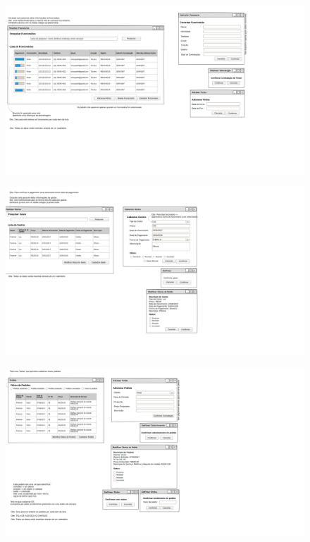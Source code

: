 \documentclass[a4paper,12pt]{article}
\begin{document}
		\begin{figure}[H]
			\centering \includegraphics[width=\textwidth]{./Gerenciar Funcionario.png} 
		\end{figure}
		\begin{figure}[H]
			\centering \includegraphics[width=\textwidth]{./Gerenciar Gastos.png} 
		\end{figure}
		\begin{figure}[H]
			\centering \includegraphics[width=\textwidth]{./Gerenciar Pedidos.png}
		\end{figure}
\end{document}
